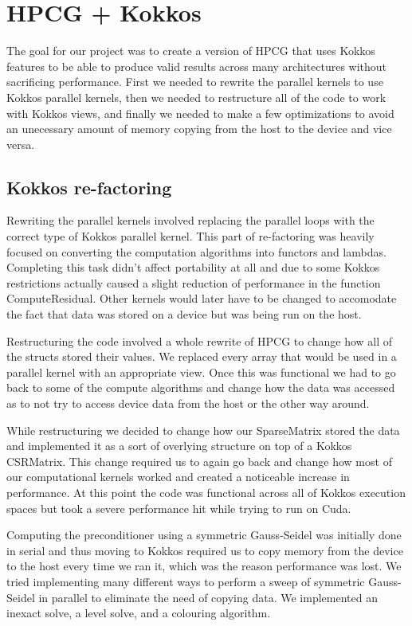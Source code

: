 \documentclass{ccr15}
\begin{document}
\section{HPCG + Kokkos}
The goal for our project was to create a version of HPCG that uses Kokkos features to be able to
produce valid results across many architectures without sacrificing performance. First we needed
to rewrite the parallel kernels to use Kokkos parallel kernels, then we needed to restructure 
all of the code to work with Kokkos views, and finally we needed to make a few optimizations to
avoid an unecessary amount of memory copying from the host to the device and vice versa.
\subsection{Kokkos re-factoring}
Rewriting the parallel kernels involved replacing the parallel loops with the correct type of
Kokkos parallel kernel. This part of re-factoring was heavily focused on converting the
computation algorithms into functors and lambdas. Completing this task didn't affect portability
at all and due to some Kokkos restrictions actually caused a slight reduction of performance in
the function ComputeResidual. Other kernels would later have to be changed to accomodate the fact
that data was stored on a device but was being run on the host.

Restructuring the code involved a whole rewrite of HPCG to change how all of the structs stored
their values. We replaced every array that would be used in a parallel kernel with an appropriate
view. Once this was functional we had to go back to some of the compute algorithms and change
how the data was accessed as to not try to access device data from the host or the
other way around.

While restructuring we decided to change how our SparseMatrix stored the data and implemented it
as a sort of overlying structure on top of a Kokkos CSRMatrix. This change required us to again
go back and change how most of our computational kernels worked and created a noticeable increase
in performance. At this point the code was functional across all of Kokkos execution spaces but
took a severe performance hit while trying to run on Cuda.

Computing the preconditioner using a symmetric Gauss-Seidel was initially done in serial and thus
moving to Kokkos required us to copy memory from the device to the host every time we ran it,
which was the reason performance was lost. We tried implementing many different ways to perform
a sweep of symmetric Gauss-Seidel in parallel to eliminate the need of copying data. We
implemented an inexact solve, a level solve, and a colouring algorithm.
\end{document}
